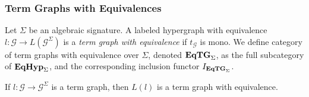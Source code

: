 \subsubsection{Term Graphs with Equivalences}

\begin{definition}
	Let $\Sigma$ be an algebraic signature.
	A labeled hypergraph with equivalence $l: \mathcal{G} \to L(\mathcal{G}^\Sigma)$ is a \emph{term graph with equivalence} if $t_{\mathcal{G}}$ is mono.
	We define category of term graphs with equivalence over $\Sigma$, denoted $\textbf{\textup{EqTG}}_{\Sigma}$, as the full subcategory of $\textbf{\textup{EqHyp}}_\Sigma$,
	and the corresponding inclusion functor $I_{\textbf{\textup{EqTG}}_\Sigma}$.
\end{definition}

\begin{proposition}
	If $l: \mathcal{G \to G}^\Sigma$ is a term graph, then $L(l)$ is a term graph with equivalence.
\end{proposition}
